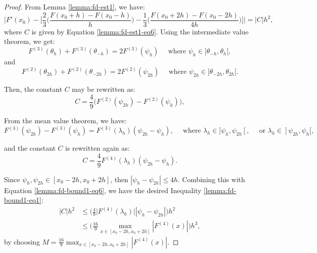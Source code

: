 \begin{proof}
	From Lemma \ref{lemma:fd-est1}, we have:
	\begin{equation*}
        	\bigg|F'(x_0) - \bigg[ \frac{2}{3} \bigg(\frac{F(x_0+h) - F(x_0-h)}{h}\bigg)
               - \frac{1}{3} \bigg(\frac{F(x_0+2h) - F(x_0-2h)}{4h}\bigg)
		\bigg] \bigg| = |C|h^2,
	\end{equation*}
	where $C$ is given by Equation \eqref{lemma:fd-est1-eq6}. 
	Using the intermediate value theorem, we get:
	\begin{equation}
                \label{lemma:fd-bound1-eq2}
		F^{(3)}(\theta_{h}) + F^{(3)}(\theta_{-h}) = 
		2 F^{(3)}(\psi_{h})
		\quad \text{ where } \psi_{h} \in ]\theta_{-h},\theta_{h}[,
        \end{equation}
	and	
	\begin{equation}
                \label{lemma:fd-bound1-eq3}
		F^{(2)}(\theta_{2h}) + F^{(2)}(\theta_{-2h}) = 
		2 F^{(2)}(\psi_{2h})
		\quad \text{ where } \psi_{2h} \in ]\theta_{-2h},\theta_{2h}[.
       \end{equation}

       Then, the constant $C$ may be rewritten as:
       \begin{equation}
               \label{lemma:fd-bound1-eq4}
		       C = \frac{4}{9}\bigg(F^{(2)}(\psi_{2h}) - F^{(2)}(\psi_{h})\bigg), 
       \end{equation}

       From the mean value theorem, we have:
       \begin{equation}
               \label{lemma:fd-found1-eq5}
	       F^{(3)}(\psi_{2h})- F^{(3)}(\psi_{h}) = F^{(3)}(\lambda_h) (\psi_{2h} - \psi_{h}), 
	       \quad \text{ where } \lambda_{h} \in ]\psi_h, \psi_{2h}[,
	       \quad \text{ or }   \lambda_{h} \in ]\psi_{2h}, \psi_{h}[,
       \end{equation}

       and the constant $C$ is rewritten again as:
	\begin{equation}
               \label{lemma:fd-bound1-eq6}
               C = \frac{4}{9} F^{(4)}(\lambda_h) (\psi_{2h} - \psi_{h}).
	\end{equation}

	Since $\psi_{h}, \psi_{2h} \in [x_0-2h,x_0+2h]$, then $|\psi_{h} - \psi_{2h}| \leq 4h$.
	Combining this with  Equation \eqref{lemma:fd-bound1-eq6}, 
	we have the desired Inequality \eqref{lemma:fd-bound1-eq1}:
	\begin{align*}
                \label{lemma:fd-bound1-eq7}
		|C|h^2  &\leq \bigg( \frac{4}{9} \big|F^{(4)}(\lambda_h)\big| |\psi_{h} - \psi_{2h}| \bigg) h^2\\
			&\leq \bigg( \frac{16}{9} \max_{x \in [x_0-2h,x_0+2h]}{|F^{(4)}(x)|} \bigg) h^3,
        \end{align*}
	by choosing $M = \frac{16}{9}\max_{x \in [x_0-2h,x_0+2h]}{|F^{(4)}(x)|}$.
	\renewcommand\qedsymbol{} %
\end{proof}
